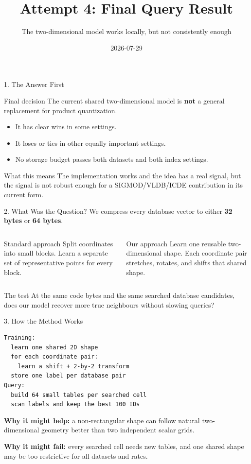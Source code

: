 \documentclass[aspectratio=169]{beamer}
\title{Attempt 4: Final Query Result}
\subtitle{The two-dimensional model works locally, but not consistently enough}
\author{}
\date{2026-07-29}
\begin{document}
\begin{frame}\titlepage\end{frame}

\begin{frame}{1. The Answer First}
\begin{alertblock}{Final decision}
The current shared two-dimensional model is \textbf{not} a general
replacement for product quantization.
\end{alertblock}
\begin{itemize}
  \item It has clear wins in some settings.
  \item It loses or ties in other equally important settings.
  \item No storage budget passes both datasets and both index settings.
\end{itemize}
\begin{block}{What this means}
The implementation works and the idea has a real signal, but the signal is
not robust enough for a SIGMOD/VLDB/ICDE contribution in its current form.
\end{block}
\end{frame}

\begin{frame}{2. What Was the Question?}
We compress every database vector to either \textbf{32 bytes} or
\textbf{64 bytes}.
\medskip
\begin{columns}[T]
\begin{block}{Standard approach}
Split coordinates into small blocks. Learn a separate set of representative
points for every block.
\end{block}
\begin{block}{Our approach}
Learn one reusable two-dimensional shape. Each coordinate pair stretches,
rotates, and shifts that shared shape.
\end{block}
\end{columns}
\begin{alertblock}{The test}
At the same code bytes and the same searched database candidates, does our
model recover more true neighbours without slowing queries?
\end{alertblock}
\end{frame}

\begin{frame}[fragile]{3. How the Method Works}
\small
\begin{verbatim}
Training:
  learn one shared 2D shape
  for each coordinate pair:
    learn a shift + 2-by-2 transform
  store one label per database pair
Query:
  build 64 small tables per searched cell
  scan labels and keep the best 100 IDs
\end{verbatim}
\textbf{Why it might help:} a non-rectangular shape can follow natural
two-dimensional geometry better than two independent scalar grids.
\medskip

\textbf{Why it might fail:} every searched cell needs new tables, and one
shared shape may be too restrictive for all datasets and rates.
\end{frame}
\end{document}
